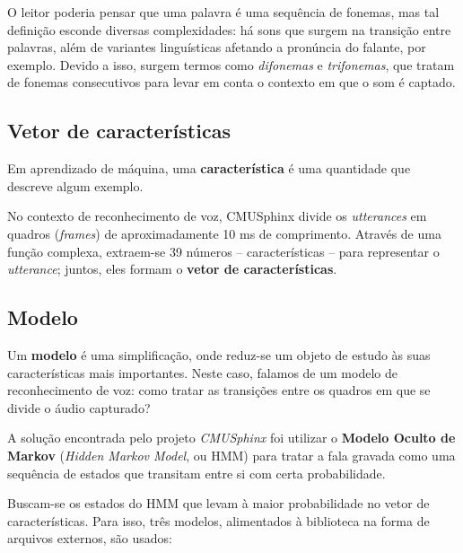 O leitor poderia pensar que uma palavra é uma sequência de fonemas, mas tal definição esconde diversas complexidades: há sons que surgem na transição entre palavras, além de variantes linguísticas afetando a pronúncia do falante, por exemplo. Devido a isso, surgem termos como \emph{difonemas} e \emph{trifonemas}, que tratam de fonemas consecutivos para levar em conta o contexto em que o som é captado.


\subsection{Vetor de características}

Em aprendizado de máquina, uma \textbf{característica} é uma quantidade que descreve algum exemplo.

No contexto de reconhecimento de voz, CMUSphinx divide os \textit{utterances} em quadros (\textit{frames}) de aproximadamente 10 ms de comprimento. Através de uma função complexa, extraem-se 39 números -- características -- para representar o \textit{utterance}; juntos, eles formam o \textbf{vetor de características}.


\subsection{Modelo}
\label{pocketsphinx-models}

Um \textbf{modelo} é uma simplificação, onde reduz-se um objeto de estudo às suas características mais importantes. Neste caso, falamos de um modelo de reconhecimento de voz: como tratar as transições entre os quadros em que se divide o áudio capturado?

A solução encontrada pelo projeto \textit{CMUSphinx} foi utilizar o \textbf{Modelo Oculto de Markov} (\textit{Hidden Markov Model}, ou HMM\iffalse, conforme visto na seção \ref{cap:hmm}\fi) para tratar a fala gravada como uma sequência de estados que transitam entre si com certa probabilidade.

Buscam-se os estados do HMM que levam à maior probabilidade no vetor de características. Para isso, três modelos, alimentados à biblioteca na forma de arquivos externos, são usados:

